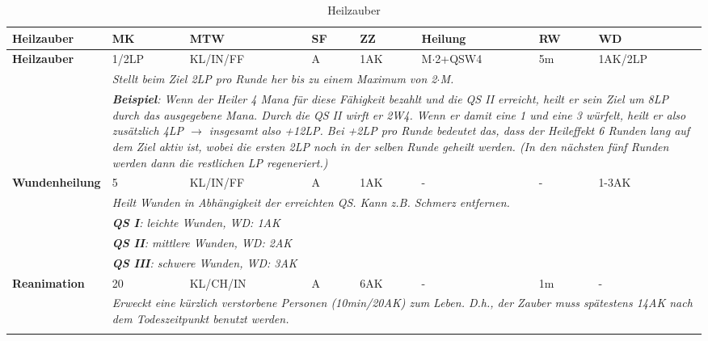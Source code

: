 \begin{longtable}{|p{4cm}|p{1.1cm}|p{2.2cm}|p{0.8cm}|p{0.8cm}|p{2.2cm}|p{0.8cm}|p{2.2cm}|}
\hline
\textbf{Heilzauber} & \textbf{MK} & \textbf{MTW} & \textbf{SF} & \textbf{ZZ} & \textbf{Heilung} & \textbf{RW} & \textbf{WD} \\

\hline
\textbf{Heilzauber} & 1/2LP & KL/IN/FF & A & 1AK & M$\cdot$2+QSW4 & 5m & 1AK/2LP \\ \hline
\multicolumn{1}{r}{} & \multicolumn{7}{|p{13cm}|}{\textit{Stellt beim Ziel 2LP pro Runde her bis zu einem Maximum von 2$\cdot$M.}} \\
\multicolumn{1}{r}{} & \multicolumn{7}{|p{13cm}|}{\textit{\textbf{Beispiel}: Wenn der Heiler 4 Mana für diese Fähigkeit bezahlt und die QS II erreicht, heilt er sein Ziel um 8LP durch das ausgegebene Mana. Durch die QS II wirft er 2W4. Wenn er damit eine 1 und eine 3 würfelt, heilt er also zusätzlich 4LP $\rightarrow$ insgesamt also +12LP. Bei +2LP pro Runde bedeutet das, dass der Heileffekt 6 Runden lang auf dem Ziel aktiv ist, wobei die ersten 2LP noch in der selben Runde geheilt werden. (In den nächsten fünf Runden werden dann die restlichen LP regeneriert.)}} \\

\hline
\textbf{Wundenheilung} & 5 & KL/IN/FF & A & 1AK & - & - & 1-3AK \\ \hline
\multicolumn{1}{r}{} & \multicolumn{7}{|p{13cm}|}{\textit{Heilt Wunden in Abhängigkeit der erreichten QS. Kann z.B. Schmerz entfernen.}} \\
\multicolumn{1}{r}{} & \multicolumn{7}{|p{13cm}|}{\textit{\textbf{QS I}: leichte Wunden, WD: 1AK}} \\
\multicolumn{1}{r}{} & \multicolumn{7}{|p{13cm}|}{\textit{\textbf{QS II}: mittlere Wunden, WD: 2AK}} \\
\multicolumn{1}{r}{} & \multicolumn{7}{|p{13cm}|}{\textit{\textbf{QS III}: schwere Wunden, WD: 3AK}} \\

\hline
\textbf{Reanimation} & 20 & KL/CH/IN & A & 6AK & - & 1m & - \\ \hline
\multicolumn{1}{r}{} & \multicolumn{7}{|p{13cm}|}{\textit{Erweckt eine kürzlich verstorbene Personen (10min/20AK) zum Leben. D.h., der Zauber muss spätestens 14AK nach dem Todeszeitpunkt benutzt werden.}} \\

\cline{2-8}
\caption{Heilzauber}
\label{tab:Heilzauber}
\end{longtable}

